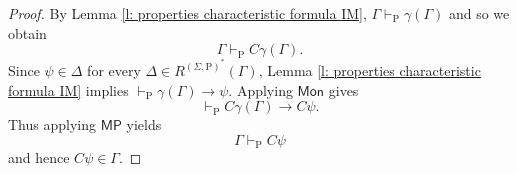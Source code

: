 \documentclass{myifcolog}
\newcommand\C {C}
\newcommand{\hickp}{\mathrm{P}}
\numberwithin{theorem}{section}
\begin{document}
\begin{proof}
    \noindent By Lemma \ref{l: properties characteristic formula IM}, $\Gamma \vdash_\mathrm{P} \gamma(\Gamma)$ and so we obtain
    \begin{equation*}
        \Gamma \vdash_\mathrm{P} \C \gamma(\Gamma).
    \end{equation*}
   Since $\psi \in \Delta$ for every $\Delta \in R^{(\Sigma, \hickp)^*}(\Gamma)$, Lemma \ref{l: properties characteristic formula IM} implies $\vdash_\mathrm{P} \gamma(\Gamma) \rightarrow \psi$. Applying $\mathsf{Mon}$ gives
   \begin{equation*}
       \vdash_\mathrm{P} \C \gamma(\Gamma) \rightarrow \C \psi.
   \end{equation*}
   Thus applying $\mathsf{MP}$ yields
   \begin{equation*}
       \Gamma \vdash_\mathrm{P} \C \psi
   \end{equation*}
   and hence $\C \psi \in \Gamma$. \smallskip


\end{proof}
\end{document}
